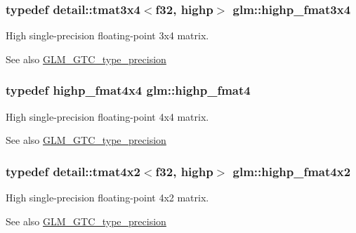 \subsubsection[{\texorpdfstring{highp\+\_\+fmat3x4}{highp_fmat3x4}}]{\setlength{\rightskip}{0pt plus 5cm}typedef detail\+::tmat3x4$<$f32, highp$>$ {\bf glm\+::highp\+\_\+fmat3x4}}\hypertarget{group__gtc__type__precision_ga1f377a3da21dd6c418ec3a5119a4514a}{}\label{group__gtc__type__precision_ga1f377a3da21dd6c418ec3a5119a4514a}
High single-\/precision floating-\/point 3x4 matrix. \begin{DoxySeeAlso}{See also}
\hyperlink{group__gtc__type__precision}{G\+L\+M\+\_\+\+G\+T\+C\+\_\+type\+\_\+precision} 
\end{DoxySeeAlso}
\subsubsection[{\texorpdfstring{highp\+\_\+fmat4}{highp_fmat4}}]{\setlength{\rightskip}{0pt plus 5cm}typedef highp\+\_\+fmat4x4 {\bf glm\+::highp\+\_\+fmat4}}\hypertarget{group__gtc__type__precision_ga4c7c9823ade7c29e29b5a313949ae502}{}\label{group__gtc__type__precision_ga4c7c9823ade7c29e29b5a313949ae502}
High single-\/precision floating-\/point 4x4 matrix. \begin{DoxySeeAlso}{See also}
\hyperlink{group__gtc__type__precision}{G\+L\+M\+\_\+\+G\+T\+C\+\_\+type\+\_\+precision} 
\end{DoxySeeAlso}
\subsubsection[{\texorpdfstring{highp\+\_\+fmat4x2}{highp_fmat4x2}}]{\setlength{\rightskip}{0pt plus 5cm}typedef detail\+::tmat4x2$<$f32, highp$>$ {\bf glm\+::highp\+\_\+fmat4x2}}\hypertarget{group__gtc__type__precision_gab3d688f05a884be93c647bce2d8a46f4}{}\label{group__gtc__type__precision_gab3d688f05a884be93c647bce2d8a46f4}
High single-\/precision floating-\/point 4x2 matrix. \begin{DoxySeeAlso}{See also}
\hyperlink{group__gtc__type__precision}{G\+L\+M\+\_\+\+G\+T\+C\+\_\+type\+\_\+precision} 
\end{DoxySeeAlso}
